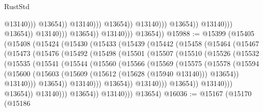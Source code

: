 \begin{lexlean}{RustStd}
\begin{coremodule}
                                                                @13140)))
                                                          @13654))
                                                      @13140)))
                                                @13654))
                                            @13140)))
                                      @13654))
                                  @13140)))
                            @13654))
                        @13140)))
                  @13654))
              @13140)))
        @13654))
@15988 := @15399
    (@15405
      (@15408
        (@15424
          (@15430
            (@15433
              (@15439
                (@15442
                  (@15458
                    (@15464
                      (@15467
                        (@15473
                          (@15476
                            (@15492
                              (@15498
                                (@15501
                                  (@15507
                                    (@15510
                                      (@15526
                                        (@15532
                                          (@15535
                                            (@15541
                                              (@15544
                                                (@15560
                                                  (@15566
                                                    (@15569
                                                      (@15575
                                                        (@15578
                                                          (@15594
                                                            (@15600
                                                              (@15603
                                                                (@15609
                                                                  (@15612 (@15628 (@15940 @13140)))
                                                                  @13654))
                                                              @13140)))
                                                        @13654))
                                                    @13140)))
                                              @13654))
                                          @13140)))
                                    @13654))
                                @13140)))
                          @13654))
                      @13140)))
                @13654))
            @13140)))
      @13654)
@16036 := @15167
    (@15170
      (@15186

\end{coremodule}
\end{lexlean}
